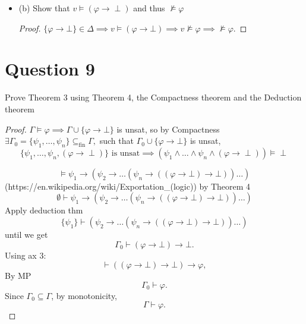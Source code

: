 \documentclass{article}
\begin{document}
\begin{itemize}
\begin{proof}
        \subsubsection*{Case $\impliedby$}
        Suppose otherwise, $a\rightarrow b \in \Delta$, $v\models a$ and $v\not \models b$. 
        By IH, $a \in \Delta$ and $b \notin \Delta$, $b \rightarrow \bot \in \Delta\implies \Delta \vdash a, \Delta \vdash a \rightarrow b,$ by MP,
        $\Delta \vdash b \implies b \in \Delta$, contradiction.
    \end{proof}
    \item (b) Show that $v \models (\varphi \rightarrow \perp)$ and thus $\not\models \varphi$
    \begin{proof}
        $\{\varphi \rightarrow \bot\} \in \Delta \implies v \models (\varphi \rightarrow \bot) \implies v \not \models \varphi \implies \not \models \varphi$.
    \end{proof}
\end{itemize}

\section*{Question 9}
Prove Theorem 3 using Theorem 4, the Compactness theorem and the Deduction theorem
\begin{proof}
    $\Gamma \models \varphi \implies \Gamma \cup \{\varphi \rightarrow \bot\}$ is unsat, so by Compactness
    $
    \exists \Gamma_0 = \{\psi_1,\dots,\psi_n\} \subseteq_{\mathrm{fin}} \Gamma,
    $ such that
    $
    \Gamma_0 \cup \{\varphi \rightarrow \bot\}$
    is unsat, 
    \[ \{\psi_1, \dots, \psi_n, (\varphi \rightarrow \perp)\} \text{ is unsat} \implies 
    (\psi_1 \land \dots \land \psi_n \land (\varphi \rightarrow \perp)) \models \perp
    \]

    \[
    \models \psi_1 \rightarrow (\psi_2 \rightarrow \dots (\psi_n \rightarrow ((\varphi \rightarrow \bot)\rightarrow \bot))\dots)
    \]
    (https://en.wikipedia.org/wiki/Exportation\_(logic)) by Theorem 4
    \[
    \emptyset \vdash \psi_1 \rightarrow (\psi_2 \rightarrow \dots (\psi_n \rightarrow ((\varphi \rightarrow \bot)\rightarrow \bot))\dots)
    \]
    Apply deduction thm 
    \[\{\psi_1\}\vdash (\psi_2 \rightarrow \dots (\psi_n \rightarrow ((\varphi \rightarrow \bot)\rightarrow \bot))\dots)\]
    until we get
    \[
    \Gamma_0 \vdash (\varphi \rightarrow \bot)\rightarrow \bot.
    \]
    Using ax 3:
    \[
    \vdash ((\varphi \rightarrow \bot)\rightarrow \bot)\rightarrow \varphi,
    \]
    By MP
    \[
    \Gamma_0 \vdash \varphi.
    \]
    Since $\Gamma_0 \subseteq \Gamma$, by monotonicity,
    \[
    \Gamma \vdash \varphi.
    \]
    \end{proof}
\end{document}
